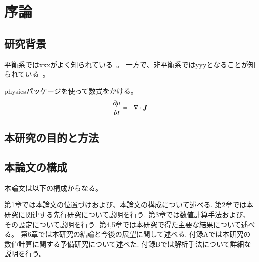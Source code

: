 \documentclass[../thesis]{subfiles}
\begin{document}
\chapter{序論}

\section{研究背景}
平衡系ではxxxがよく知られている~\cite{zwanzig2001nonequilibrium}。
一方で、非平衡系ではyyyとなることが知られている~\cite{Widder1989,Stolovitzky1998}。

physicsパッケージを使って数式をかける。
\begin{equation}
\pdv{\rho}{t} = -\nabla \cdot \bm{J}
\end{equation}

\section{本研究の目的と方法}

\section{本論文の構成}
本論文は以下の構成からなる。

第1章では本論文の位置づけおよび、本論文の構成について述べる.
第2章では本研究に関連する先行研究について説明を行う.
第3章では数値計算手法および、その設定について説明を行う.
第4,5章では本研究で得た主要な結果について述べる。
第6章では本研究の結論と今後の展望に関して述べる.
付録Aでは本研究の数値計算に関する予備研究について述べた.
付録Bでは解析手法について詳細な説明を行う。
\end{document}
